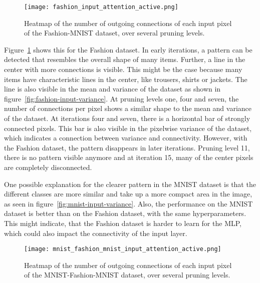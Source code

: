 \begin{figure}[ht] %
    \centering\texttt{[image: fashion\_input\_attention\_active.png]}
    \caption[Pixel connectivity Fashion-MNIST]{
        Heatmap of the number of outgoing connections of each input pixel of the Fashion-MNIST dataset, over several pruning levels.
        }\label{fig:fashion-heatmap}
\end{figure}

Figure~\ref{fig:fashion-heatmap} shows this for the Fashion dataset.
In early iterations, a pattern can be detected that resembles the overall shape of many items.
Further, a line in the center with more connections is visible.
This might be the case because many items have characteristic lines in the center, like trousers, shirts or jackets.
The line is also visible in the mean and variance of the dataset as shown in figure~\ref{fig:fashion-input-variance}.
At pruning levels one, four and seven, the number of connections per pixel shows a similar shape to the mean and variance of the dataset.
At iterations four and seven, there is a horizontal bar of strongly connected pixels. 
This bar is also visible in the pixelwise variance of the dataset, which indicates a connection between variance and connectivity.
However, with the Fashion dataset, the pattern disappears in later iterations.
Pruning level 11, there is no pattern visible anymore and at iteration 15, many of the center pixels are completely disconnected.

One possible explanation for the clearer pattern in the MNIST dataset is that the different classes are more similar and take up a more compact area in the image, as seen in figure~\ref{fig:mnist-input-variance}.
Also, the performance on the MNIST dataset is better than on the Fashion dataset, with the same hyperparameters.
This might indicate, that the Fashion dataset is harder to learn for the {MLP}, which could also impact the connectivity of the input layer.

\begin{figure}[ht] %
    \centering
    \texttt{[image: mnist\_fashion\_mnist\_input\_attention\_active.png]}
    \caption[Pixel connectivity MNIST-Fashion-MNIST]{
    Heatmap of the number of outgoing connections of each input pixel of the MNIST-Fashion-MNIST dataset, over several pruning levels.}\label{fig:mnist-fashion-map}
\end{figure}

